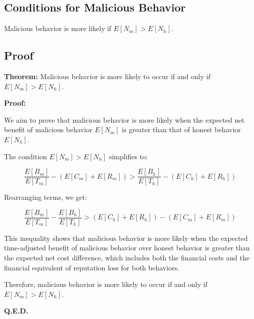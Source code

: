 \subsection{Conditions for Malicious Behavior}

Malicious behavior is more likely if \( E[N_m] > E[N_h] \).

\subsection{Proof}

\textbf{Theorem:} Malicious behavior is more likely to occur if and only if \( E[N_m] > E[N_h] \).

\textbf{Proof:}

We aim to prove that malicious behavior is more likely when the expected net benefit of malicious behavior \( E[N_m] \) is greater than that of honest behavior \( E[N_h] \).

The condition \( E[N_m] > E[N_h] \) simplifies to:

\[
    \frac{E[B_m]}{E[T_m]} - (E[C_m] + E[R_m]) > \frac{E[B_h]}{E[T_h]} - (E[C_h] + E[R_h])
\]

Rearranging terms, we get:

\[
    \frac{E[B_m]}{E[T_m]} - \frac{E[B_h]}{E[T_h]} > (E[C_h] + E[R_h]) - (E[C_m] + E[R_m])
\]

This inequality shows that malicious behavior is more likely when the expected time-adjusted benefit of malicious behavior over honest behavior is greater than the expected net cost difference, which includes both the financial costs and the financial equivalent of reputation loss for both behaviors.

Therefore, malicious behavior is more likely to occur if and only if \( E[N_m] > E[N_h] \).

\textbf{Q.E.D.}

